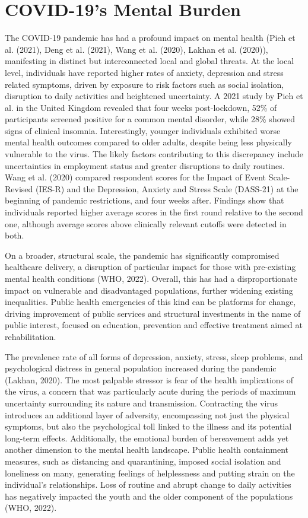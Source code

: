  \section{COVID-19's Mental Burden}
    The COVID-19 pandemic has had a profound impact on mental health (Pieh et al. (2021), Deng et al. (2021), Wang et al. (2020), Lakhan et al. (2020)), manifesting in distinct but interconnected local and global threats. At the local level, individuals have reported higher rates of anxiety, depression and stress related symptoms, driven by exposure to risk factors such as social isolation, disruption to daily activities and heightened uncertainty. 
    A 2021 study by Pieh et al. in the United Kingdom revealed that four weeks post-lockdown, 52\% of participants screened positive for a common mental disorder, while 28\% showed signs of clinical insomnia. Interestingly, younger individuals exhibited worse mental health outcomes compared to older adults, despite being less physically vulnerable to the virus. The likely factors contributing to this discrepancy include uncertainties in employment status and greater disruptions to daily routines. 
    Wang et al. (2020) compared respondent scores for the Impact of Event Scale-Revised (IES-R) and the Depression, Anxiety and Stress Scale (DASS-21) at the beginning of pandemic restrictions, and four weeks after. Findings show that individuals reported higher average scores in the first round relative to the second one, although average scores above clinically relevant cutoffs were detected in both. 

    On a broader, structural scale, the pandemic has significantly compromised healthcare delivery, a disruption of particular impact for those with pre-existing mental health conditions (WHO, 2022). Overall, this has had a disproportionate impact on vulnerable and disadvantaged populations, further widening existing inequalities. 
    Public health emergencies of this kind can be platforms for change, driving improvement of public services and structural investments in the name of public interest, focused on education, prevention and effective treatment aimed at rehabilitation. 

    The prevalence rate of all forms of depression, anxiety, stress, sleep problems, and psychological distress in general population increased during the pandemic (Lakhan, 2020). 
    The most palpable stressor is fear of the health implications of the virus, a concern that was particularly acute during the periods of maximum uncertainty surrounding its nature and transmission. Contracting the virus introduces an additional layer of adversity, encompassing not just the physical symptoms, but also the psychological toll linked to the illness and its potential long-term effects. Additionally, the emotional burden of bereavement adds yet another dimension to the mental health landscape.
    Public health containment measures, such as distancing and quarantining, imposed social isolation and loneliness on many, generating feelings of helplessness and putting strain on the individual's relationships. Loss of routine and abrupt change to daily activities has negatively impacted the youth and the older component of the populations (WHO, 2022). 

